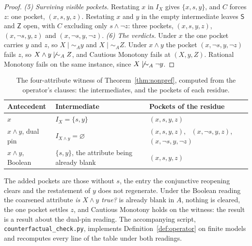 \begin{proof}
\emph{(5) Surviving visible pockets.} Restating $x$ in $I_X$ gives $\{x, s, y\}$, and $C$ forces $z$: one pocket, $(x, s, y, z)$. Restating $x$ and $y$ in the empty intermediate leaves $\mathsf{S}$ and $\mathsf{Z}$ open, with $C$ excluding only $s \wedge \neg z$: three pockets, $(x, s, y, z)$, $(x, \neg s, y, z)$ and $(x, \neg s, y, \neg z)$.
\emph{(6) The verdicts.} Under $x$ the one pocket carries $y$ and $z$, so $X \mid\sim_A y$ and $X \mid\sim_A Z$. Under $x \wedge y$ the pocket $(x, \neg s, y, \neg z)$ fails $z$, so $X \wedge y \not\mid\sim_A Z$, and Cautious Monotony fails at $(X, y, Z)$. Rational Monotony fails on the same instance, since $X \not\mid\sim_A \neg y$.
\end{proof}

\begin{table}[ht]
\centering
\small
\caption{The four-attribute witness of Theorem~\ref{thm:nonpref}, computed from the operator's clauses: the intermediates, and the pockets of each residue.}
\label{tab:witness}
\begin{tabular}{@{}lll@{}}
\toprule
Antecedent & Intermediate & Pockets of the residue \\
\midrule
$x$ & $I_X = \{s, y\}$ & $(x, s, y, z)$ \\
$x \wedge y$, dual pin & $I_{X \wedge y} = \varnothing$ & $(x, s, y, z)$, \ $(x, \neg s, y, z)$, \ $(x, \neg s, y, \neg z)$ \\
$x \wedge y$, Boolean & $\{s, y\}$, the attribute being already blank & $(x, s, y, z)$ \\
\bottomrule
\end{tabular}
\end{table}

\noindent The added pockets are those without $s$, the entry the conjunctive reopening clears and the restatement of $y$ does not regenerate. Under the Boolean reading the coarsened attribute \emph{is $X \wedge y$ true?} is already blank in $A$, nothing is cleared, the one pocket settles $z$, and Cautious Monotony holds on the witness: the result is a result about the dual-pin reading. The accompanying script, \texttt{counterfactual\_check.py}, implements Definition~\ref{def:operator} on finite models and recomputes every line of the table under both readings.

